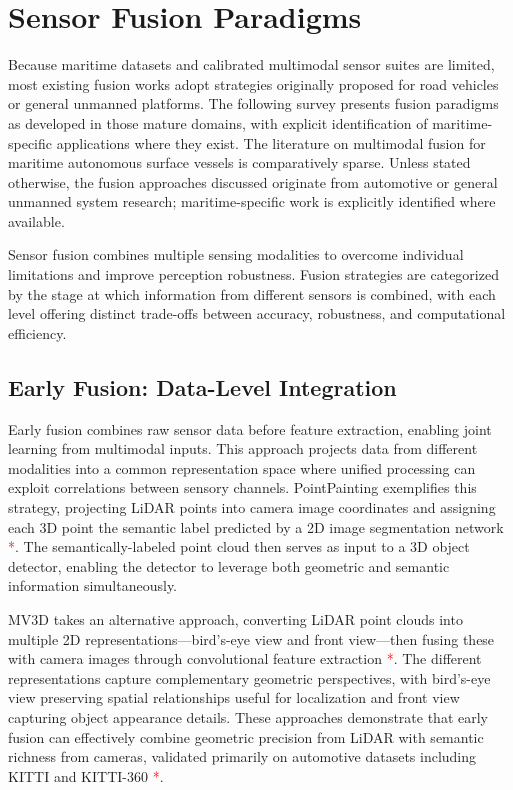 \documentclass[../main.tex]{subfiles}
\begin{document}
\section{Sensor Fusion Paradigms}

Because maritime datasets and calibrated multimodal sensor suites are limited, most existing fusion works adopt strategies originally proposed for road vehicles or general unmanned platforms. The following survey presents fusion paradigms as developed in those mature domains, with explicit identification of maritime-specific applications where they exist. The literature on multimodal fusion for maritime autonomous surface vessels is comparatively sparse. Unless stated otherwise, the fusion approaches discussed originate from automotive or general unmanned system research; maritime-specific work is explicitly identified where available.

Sensor fusion combines multiple sensing modalities to overcome individual limitations and improve perception robustness. Fusion strategies are categorized by the stage at which information from different sensors is combined, with each level offering distinct trade-offs between accuracy, robustness, and computational efficiency.

\subsection{Early Fusion: Data-Level Integration}

Early fusion combines raw sensor data before feature extraction, enabling joint learning from multimodal inputs. This approach projects data from different modalities into a common representation space where unified processing can exploit correlations between sensory channels. PointPainting exemplifies this strategy, projecting LiDAR points into camera image coordinates and assigning each 3D point the semantic label predicted by a 2D image segmentation network \textcolor{red}{*}. The semantically-labeled point cloud then serves as input to a 3D object detector, enabling the detector to leverage both geometric and semantic information simultaneously.

MV3D takes an alternative approach, converting LiDAR point clouds into multiple 2D representations—bird's-eye view and front view—then fusing these with camera images through convolutional feature extraction \textcolor{red}{*}. The different representations capture complementary geometric perspectives, with bird's-eye view preserving spatial relationships useful for localization and front view capturing object appearance details. These approaches demonstrate that early fusion can effectively combine geometric precision from LiDAR with semantic richness from cameras, validated primarily on automotive datasets including KITTI and KITTI-360 \textcolor{red}{*}.
\end{document}
